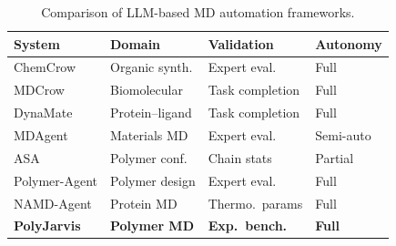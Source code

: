\documentclass[journal=acsami,manuscript=article]{achemso}
\begin{document}
\begin{table}[ht]
\centering
\caption{Comparison of LLM-based MD automation frameworks.}
\label{tab:comparison_agents}
\small
\begin{tabular}{@{}llll@{}}
\toprule
\textbf{System} & \textbf{Domain} & \textbf{Validation} & \textbf{Autonomy} \\
\midrule
ChemCrow\cite{bran2024chemcrow} & Organic synth. & Expert eval. & Full \\
MDCrow\cite{campbell2025mdcrow} & Biomolecular & Task completion & Full \\
DynaMate\cite{guilbert2025dynamate} & Protein--ligand & Task completion & Full \\
MDAgent\cite{shi2025mdagent} & Materials MD & Expert eval. & Semi-auto \\
ASA\cite{liu2025asa} & Polymer conf. & Chain stats & Partial \\
Polymer-Agent\cite{nigam2026polymeragent} & Polymer design & Expert eval. & Full \\
NAMD-Agent\cite{chandrasekhar2025namdagent} & Protein MD & Thermo.\ params & Full \\
\textbf{PolyJarvis} & \textbf{Polymer MD} & \textbf{Exp.\ bench.} & \textbf{Full} \\
\bottomrule
\end{tabular}
\end{table}
\end{document}
